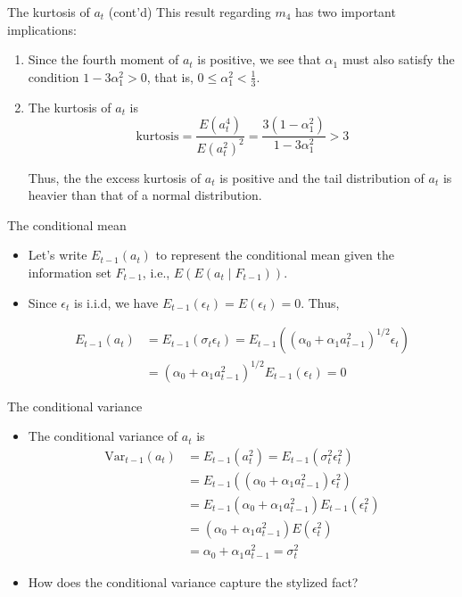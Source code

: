 \documentclass[presentation,10pt]{beamer}
\newcommand{\var}{\mathrm{Var}}
\begin{document}
\begin{frame}[label={sec:orgadc777e}]{The kurtosis of \(a_t\) (cont'd)}
This result regarding \(m_4\) has two important implications: 
\begin{enumerate}
\item Since the fourth moment of \(a_t\) is positive, we see that \(\alpha_1\) must
also satisfy the condition \(1-3\alpha_1^2 > 0\), that is, \(0 \leq
   \alpha^2_1 < \frac{1}{3}\).
\item The kurtosis of \(a_t\) is
\[\text{kurtosis} = \frac{E(a^4_t)}{E(a^2_t)^2} =
   \frac{3(1-\alpha^2_1)}{1-3\alpha_1^2}  > 3\]

Thus, the the excess kurtosis of \(a_t\) is positive and the tail
distribution of \(a_t\) is heavier than that of a normal
distribution.
\end{enumerate}
\end{frame}

\begin{frame}[label={sec:orged6bd20}]{The conditional mean}
\begin{itemize}
\item Let's write \(E_{t-1}(a_t)\) to represent the conditional mean given the
information set \(F_{t-1}\), i.e., \(E(E(a_t \mid F_{t-1}))\).

\item Since \(\epsilon_t\) is i.i.d, we have \(E_{t-1}(\epsilon_t) =
  E(\epsilon_t) = 0\). Thus, 

\begin{equation*}
\begin{split}
E_{t-1}(a_t) &= E_{t-1}(\sigma_t \epsilon_t) = E_{t-1}\left((\alpha_0 + \alpha_1 a^2_{t-1})^{1/2} \epsilon_t\right) \\
&= (\alpha_0 + \alpha_1 a^2_{t-1})^{1/2} E_{t-1}(\epsilon_t) = 0
\end{split}
\end{equation*}
\end{itemize}
\end{frame}

\begin{frame}[label={sec:org1054bca}]{The conditional variance}
\begin{itemize}
\item The conditional variance of \(a_t\) is 
\begin{equation*}
\begin{split}
\var_{t-1}(a_t) &= E_{t-1}(a^2_t) = E_{t-1} \left( \sigma^2_t \epsilon_t^2 \right) \\
&= E_{t-1}\left((\alpha_0 + \alpha_1 a^2_{t-1}) \epsilon^2_t \right) \\ 
&= E_{t-1}(\alpha_0 + \alpha_1 a^2_{t-1}) E_{t-1}(\epsilon^2_t) \\
&= (\alpha_0 + \alpha_1 a^2_{t-1}) E(\epsilon^2_t) \\
&= \alpha_0 + \alpha_1 a^2_{t-1} = \sigma^2_t
\end{split}
\end{equation*}

\item How does the conditional variance capture the stylized fact?
\end{itemize}
\end{frame}
\end{document}
